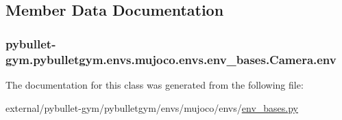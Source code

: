 \subsection{Member Data Documentation}
\subsubsection[{\texorpdfstring{env}{env}}]{\setlength{\rightskip}{0pt plus 5cm}pybullet-\/gym.\+pybulletgym.\+envs.\+mujoco.\+envs.\+env\+\_\+bases.\+Camera.\+env}\hypertarget{classpybullet-gym_1_1pybulletgym_1_1envs_1_1mujoco_1_1envs_1_1env__bases_1_1_camera_a768976121cf4e420859358847202b02f}{}\label{classpybullet-gym_1_1pybulletgym_1_1envs_1_1mujoco_1_1envs_1_1env__bases_1_1_camera_a768976121cf4e420859358847202b02f}


The documentation for this class was generated from the following file\+:\begin{DoxyCompactItemize}
\item 
external/pybullet-\/gym/pybulletgym/envs/mujoco/envs/\hyperlink{mujoco_2envs_2env__bases_8py}{env\+\_\+bases.\+py}\end{DoxyCompactItemize}
